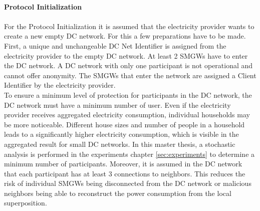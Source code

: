 \\
\textbf{Protocol Initialization}
\\
\\
For the Protocol Initialization it is assumed that the electricity provider wants to create a new empty DC network. For this a few preparations have to be made. First, a unique and unchangeable DC Net Identifier is assigned from the electricity provider to the empty DC network. At least 2 SMGWs have to enter the DC network. A DC network with only one participant is not operational and cannot offer anonymity. 
The SMGWs that enter the network are assigned a Client Identifier by the electricity provider.\\
To ensure a minimum level of protection for participants in the DC network, the DC network must have a minimum number of user. Even if the electricity provider receives aggregated electricity consumption, individual households may be more noticeable. Different house sizes and number of people in a household leads to a significantly higher electricity consumption, which is visible in the aggregated result for small DC networks. In this master thesis, a stochastic analysis is performed in the experiments chapter \ref{sec:experiments} to determine a minimum number of participants. Moreover, it is assumed in the DC network that each participant has at least 3 connections to neighbors. This reduces the risk of individual SMGWs being disconnected from the DC network or malicious neighbors being able to reconstruct the power consumption from the local superposition.\\
